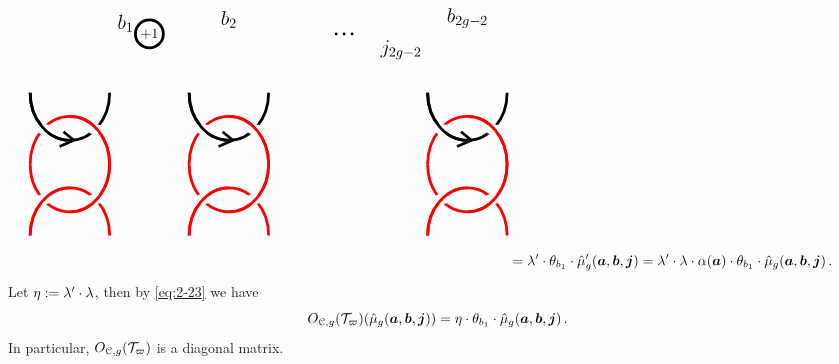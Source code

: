 \documentclass[11pt]{article}
\begin{document}
\begin{example}
\[\begin{split}
{{{\begin{tikzpicture}[line width=2pt]
\begin{scope}[shift={(-1,-1)}]
\node[left]at(10,1.6){\Large $j_{2g-2}$};
\node[above] at (2.4,1.9) {\Large $b_1$};
\begin{scope}[shift={(3,2)}]
\draw[fill=white] (0,0) circle (10pt);
\node at (0,0) {$+1$};
\end{scope}
\node[above] at (5,2) {\Large $b_2$};
\node[above] at (11,2) {\Large $b_{2g-2}$};	
\end{scope}
\foreach\x in {0,4,10}
{\begin{scope}[shift={(1+\x,-2.28)}, xscale=2, yscale=1.2]
\draw[red] (0,0) arc (0:180:0.5 and 1);  
\draw (0,1.5) arc (360:180:0.5 and 1);
\fill[white] (-0.18,0.73) circle (3pt);  
\fill[white] (-0.82,0.73) circle (3pt);  
\draw[red] (0,0) arc (0:90:0.5 and 1);  
\draw (-0.5,0.5) arc (270:180:0.5 and 1);
\draw(-0.45,0.5)--++(-0.13,0.18);\draw(-0.45,0.5)--++(-0.18,-0.13);
\end{scope}
\begin{scope}[shift={(1+\x,-2.28)}, yscale=-1.2, xscale=2
]
\draw[red] (0,0) arc (0:180:0.5 and 1);  
\draw[red] (0,1.5) arc (360:180:0.5 and 1);
\fill[white] (-0.18,0.73) circle (3pt);  
\fill[white] (-0.82,0.73) circle (3pt);  
\draw[red] (0,0) arc (0:90:0.5 and 1);  
\draw[red] (-0.5,0.5) arc (270:180:0.5 and 1);
\end{scope}}
\foreach\x in {1,2,3}{\fill[black] (6.5+0.2*\x,1) circle (1pt);}
\end{tikzpicture}}}}\\ 
&= \ld' \cdot \theta_{b_{1}} \cdot \hmu'_{g}(\bm{a}, \bm{b}, \bm{j})
= \ld' \cdot \ld \cdot \alpha(\bm{a}) \cdot \theta_{b_{1}}  \cdot \Wbase{g}{a}{b}{j}\,.
\end{split}\]
Let $\eta := {\lambda}' \cdot {\lambda}$, then by \eqref{eq:2-23} we have
\[\RTmat{\cC}{g}(\dt_{\varpi})(\Wbase{g}{a}{b}{j}) = \eta \cdot \theta_{b_{1}} \cdot \Wbase{g}{a}{b}{j}\,.\]
In particular, $\RTmat{\cC}{g}(\dt_{\varpi})$ is a diagonal matrix.
\end{example}
\end{document}
